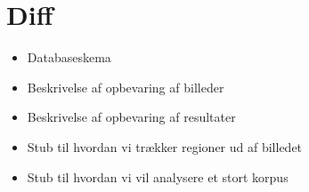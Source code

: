{
\section*{Diff}
\begin{itemize}
    \item Databaseskema
    \item Beskrivelse af opbevaring af billeder
    \item Beskrivelse af opbevaring af resultater
    \item Stub til hvordan vi trækker regioner ud af billedet
    \item Stub til hvordan vi vil analysere et stort korpus
\end{itemize}

}

